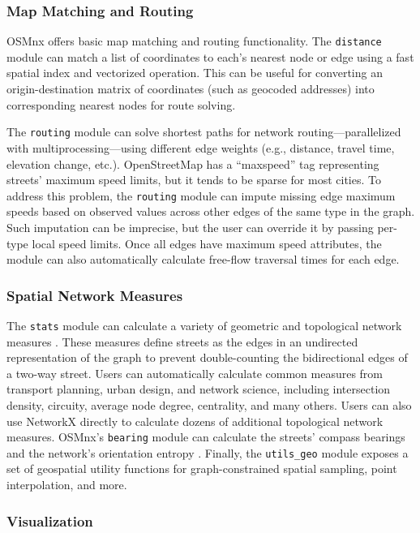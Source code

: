 \documentclass[12pt,letterpaper]{article} %
\begin{document}
\subsubsection{Map Matching and Routing}

OSMnx offers basic map matching and routing functionality. The \texttt{distance} module can match a list of coordinates to each's nearest node or edge using a fast spatial index and vectorized operation. This can be useful for converting an origin-destination matrix of coordinates (such as geocoded addresses) into corresponding nearest nodes for route solving.

The \texttt{routing} module can solve shortest paths for network routing---parallelized with multiprocessing---using different edge weights (e.g., distance, travel time, elevation change, etc.). OpenStreetMap has a \enquote{maxspeed} tag representing streets' maximum speed limits, but it tends to be sparse for most cities. To address this problem, the \texttt{routing} module can impute missing edge maximum speeds based on observed values across other edges of the same type in the graph. Such imputation can be imprecise, but the user can override it by passing per-type local speed limits. Once all edges have maximum speed attributes, the module can also automatically calculate free-flow traversal times for each edge.

\subsubsection{Spatial Network Measures}

The \texttt{stats} module can calculate a variety of geometric and topological network measures \citep{boeing_street_2022}. These measures define streets as the edges in an undirected representation of the graph to prevent double-counting the bidirectional edges of a two-way street. Users can automatically calculate common measures from transport planning, urban design, and network science, including intersection density, circuity, average node degree, centrality, and many others. Users can also use NetworkX directly to calculate dozens of additional topological network measures. OSMnx's \texttt{bearing} module can calculate the streets' compass bearings and the network's orientation entropy \citep{boeing_urban_2019}. Finally, the \texttt{utils\_geo} module exposes a set of geospatial utility functions for graph-constrained spatial sampling, point interpolation, and more.

\subsubsection{Visualization}
\end{document}
